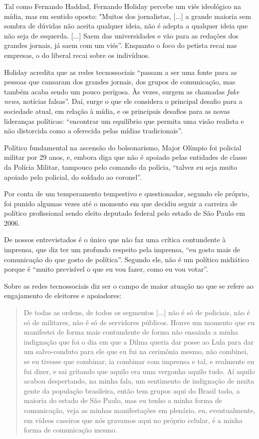 Tal como Fernando Haddad, Fernando Holiday percebe um viés ideológico na
mídia, mas em sentido oposto: "Muitos dos jornalistas, {[}...{]} a
grande maioria sem sombra de dúvidas não aceita qualquer ideia, não é
adepta a qualquer ideia que não seja de esquerda. {[}...{]} Saem das
universidades e vão para as redações dos grandes jornais, já saem com um
viés''. Enquanto o foco do petista recai nas empresas, o do liberal
recai sobre os indivíduos.

Holiday acredita que as redes tecnossociais ``passam a ser uma fonte
para as pessoas que cansaram dos grandes jornais, dos grupos de
comunicação, mas também acaba sendo um pouco perigosa. Às vezes, surgem
as chamadas \emph{fake news}, notícias falsas''. Daí, surge o que ele
considera o principal desafio para a sociedade atual, em relação à
mídia, e os principais desafios para as novas lideranças políticas:
``encontrar um equilíbrio que permita uma visão realista e não
distorcida como a oferecida pelas mídias tradicionais''.

Político fundamental na ascensão do bolsonarismo, Major Olímpio foi
policial militar por 29 anos, e, embora diga que não é apoiado pelas
entidades de classe da Polícia Militar, tampouco pelo comando da
polícia, ``talvez eu seja muito apoiado pelo policial, do soldado ao
coronel''.

Por conta de um temperamento tempestivo e questionador, segundo ele
próprio, foi punido algumas vezes até o momento em que decidiu seguir a
carreira de político profissional sendo eleito deputado federal pelo
estado de São Paulo em 2006.

De nossos entrevistados é o único que não faz uma crítica contundente à
imprensa, que diz ter um profundo respeito pela imprensa, ``eu gosto
mais de comunicação do que gosto de política''. Segundo ele, não é um
político midiático porque é ``muito previsível o que eu vou fazer, como
eu vou votar''.

Sobre as redes tecnossociais diz ser o campo de maior atuação no que se
refere ao engajamento de eleitores e apoiadores:

\begin{quote}
De todas as ordens, de todos os segmentos {[}...{]} não é só de
policiais, não é só de militares, não é só de servidores públicos. Houve
um momento que eu manifestei de forma mais contundente de forma não
ensaiada a minha indignação que foi o dia em que a Dilma queria dar
posse ao Lula para dar um salvo-conduto para ele que eu fui na cerimônia
mesmo, não combinei, se eu tivesse que combinar, ia combinar com
imprensa e tal, e realmente eu fui dizer, e sai gritando que aquilo era
uma vergonha aquilo tudo. Aí aquilo acabou despertando, na minha fala,
um sentimento de indignação de muita gente da população brasileira,
então tem grupos aqui do Brasil todo, a maioria do estado de São Paulo,
mas eu tenho a minha forma de comunicação, veja as minhas manifestações
em plenário, eu, eventualmente, em vídeos caseiros que nós gravamos aqui
no próprio celular, é a minha forma de comunicação mesmo.
\end{quote}

